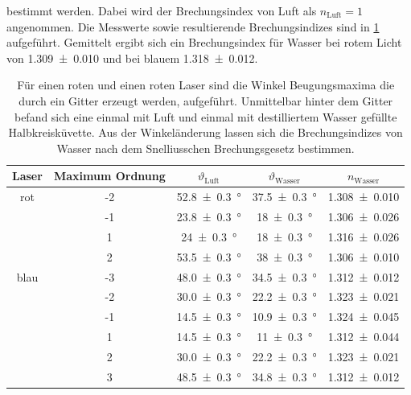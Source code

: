 \documentclass[
	a4paper,
	12pt,
	pagesize,
	ngerman
]{scrartcl}
\begin{document}
	bestimmt werden.
	Dabei wird der Brechungsindex von Luft als $n_\text{Luft} = 1$ angenommen. %
	Die Messwerte sowie resultierende Brechungsindizes sind in \cref{tab_wasser} aufgeführt.
	Gemittelt ergibt sich ein Brechungsindex für Wasser bei rotem Licht von \SI{1,309 +- 0,010}{} und bei blauem \SI{1,318 +- 0,012}{}.
	\begin{table}[H]
		\centering
		\begin{tabular}{ c | c | c | c | c}
			Laser & Maximum Ordnung & $\vartheta_\text{Luft}$ & $\vartheta_\text{Wasser}$ & $n_\text{Wasser}$ \\ \hline
			rot & -2 &\SI{52,8 +- 0,3}{\degree} & \SI{37,5 +-0,3}{\degree} & \SI{1,308 +- 0,010}{}\\
			& -1 &\SI{23,8 +- 0,3}{\degree} & \SI{18+-0,3}{\degree} & \SI{1,306 +- 0,026}{}\\
			& 1 &\SI{24 +- 0,3}{\degree} & \SI{18+-0,3}{\degree} & \SI{1,316 +- 0,026}{}\\
			& 2 &\SI{53,5 +- 0,3}{\degree} & \SI{38+-0,3}{\degree} & \SI{1,306 +- 0,010}{}\\ \hline
			blau & -3 & \SI{48,0 +- 0,3}{\degree}&\SI{34,5+-0,3}{\degree}& \SI{1,312 +- 0,012}{} \\
			& -2 & \SI{30,0 +- 0,3}{\degree}&\SI{22,2+-0,3}{\degree}& \SI{1,323 +- 0,021}{} \\
			& -1 & \SI{14,5 +- 0,3}{\degree}&\SI{10,9+-0,3}{\degree}& \SI{1,324 +- 0,045}{} \\
			& 1 & \SI{14,5 +- 0,3}{\degree}&\SI{11+-0,3}{\degree}& \SI{1,312 +- 0,044}{} \\
			& 2 & \SI{30,0 +- 0,3}{\degree}&\SI{22,2+-0,3}{\degree}& \SI{1,323 +- 0,021}{} \\
			& 3 & \SI{48,5 +- 0,3}{\degree}&\SI{34,8+-0,3}{\degree}& \SI{1,312 +- 0,012}{} \\

		\end{tabular}
		\caption{Für einen roten und einen roten Laser sind die Winkel Beugungsmaxima die durch ein Gitter erzeugt werden, aufgeführt. Unmittelbar hinter dem Gitter befand sich eine einmal mit Luft und einmal mit destilliertem Wasser gefüllte Halbkreisküvette. Aus der Winkeländerung lassen sich die Brechungsindizes von Wasser nach dem Snelliusschen Brechungsgesetz bestimmen.} 
		\label{tab_wasser}
	\end{table}
	
\end{document}
